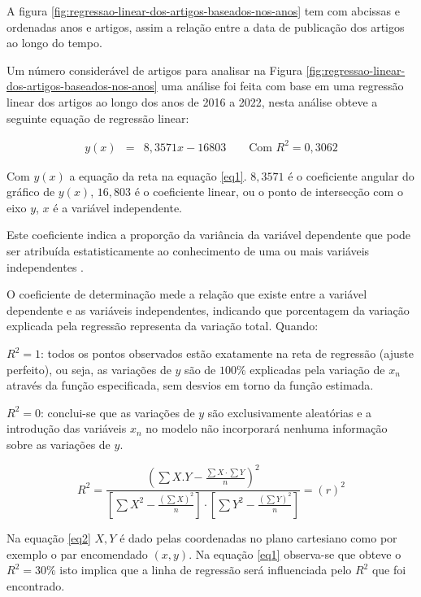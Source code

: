 

A figura \ref{fig:regressao-linear-dos-artigos-baseados-nos-anos} tem com abcissas e ordenadas anos e artigos, assim a relação entre a data de publicação dos artigos ao longo do tempo.

Um número considerável de artigos para analisar na Figura \ref{fig:regressao-linear-dos-artigos-baseados-nos-anos} uma análise foi feita com base em uma regressão linear dos artigos ao longo dos anos de 2016 a 2022, nesta análise obteve a seguinte equação de regressão linear:


\begin{eqnarray}
	y(x)&=&8,3571x - 16803 \qquad \text{Com } R^2=0,3062\label{eq1}
\end{eqnarray}

Com $y(x)$ a equação da reta na equação \eqref{eq1}. $8,3571$ é o coeficiente angular do gráfico de $ y(x)$, $16,803$ é o coeficiente linear, ou o ponto de intersecção com o eixo $y$, $x$ é a variável independente.

Este coeficiente indica a proporção da variância da variável dependente que pode ser atribuída estatisticamente ao conhecimento de uma ou mais variáveis independentes . 

O coeficiente de determinação mede a relação que existe entre a variável dependente e as variáveis independentes, indicando que porcentagem da variação explicada pela regressão representa da variação total. Quando:

$R^2=1$: todos os pontos observados estão exatamente na reta de regressão (ajuste perfeito), ou seja, as variações de $y$ são de $100\%$ explicadas pela variação de $x_n$ através da função especificada, sem desvios em torno da função estimada. 

$R^2=0$: conclui-se que as variações de $y$ são exclusivamente aleatórias e a introdução das variáveis $x_n$ no modelo não incorporará nenhuma informação sobre as variações de $y$.

\begin{equation}
	R^{2}=\frac{\left(\sum X . Y-\frac{\sum X \cdot \sum Y}{n}\right)^{2}}{\left[\sum X^{2}-\frac{\left(\sum X\right)^{2}}{n}\right] \cdot\left[\sum Y^{2}-\frac{\left(\sum Y\right)^{2}}{n}\right]}=(r)^{2}\label{eq2}
\end{equation}

Na equação \eqref{eq2} $X,Y$ é dado pelas coordenadas no plano cartesiano como por exemplo o par encomendado $(x,y)$. 
Na equação \eqref{eq1} observa-se que obteve o $R^2=30\%$ isto implica que a linha de regressão será influenciada pelo $R^2$ que foi encontrado.

